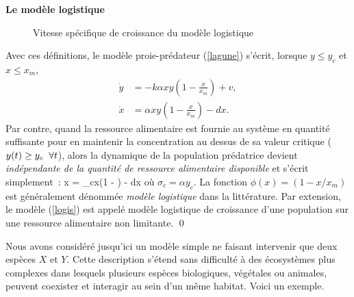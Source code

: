 \begin{exemple}{\bf Le modèle logistique}
\begin{figure}[htbp]
   \caption{Vitesse spécifique de croissance du modèle logistique}
   \label{Fig:logistic}
\end{figure}
Avec ces définitions, le modèle proie-prédateur
(\ref{lagune}) s'écrit, lorsque $y \leq y_{c}$ et $x \leq x_{m}$,
\begin{equation*} \begin{split}
\dot y &= -k\alpha xy(1 - \frac{x}{x_{m}}) + v, \\
\dot x &= \alpha xy(1 - \frac{x}{x_{m}}) - dx.
\end{split} \end{equation*}
Par contre, quand la ressource alimentaire est fournie au système en
quantité suffisante pour en maintenir la concentration au dessus de sa
valeur critique ($y(t) \geq y_{c} \hspace{2mm} \forall t$), alors la dynamique de
la population prédatrice devient {\em indépendante de la quantité de
ressource alimentaire disponible} et s'écrit simplement~:
\eqn
\dot x = \sigma_{c}x(1 - ) - dx  \label{logis}
\eeqn
où $\sigma_c = \alpha y_c$. La fonction $\phi(x) = (1 - x/x_{m})$ est généralement
dénommée {\em modèle logistique} dans la littérature. Par extension, le
modèle (\ref{logis}) est appelé modèle logistique de croissance d'une
population sur une ressource alimentaire non limitante.   \qed
\end{exemple}

Nous avons considéré jusqu'ici un modèle simple ne faisant intervenir que
deux espèces $X$ et $Y$. Cette description s'étend sans difficulté à
des écosystèmes plus complexes dans lesquels plusieurs espèces
biologiques, végétales ou animales, peuvent coexister et interagir au sein
d'un même habitat. Voici un exemple.

